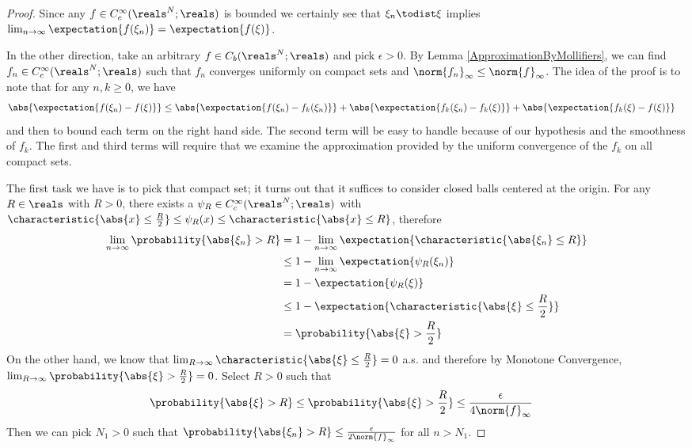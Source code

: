 \begin{proof}
Since any $f \in  C^\infty_c(\reals^N; \reals)$ is bounded we
certainly see that $\xi_n \todist \xi$ implies $\lim_{n \to \infty}
  \expectation{f(\xi_n)} = \expectation{f(\xi)}$.

In the other direction, take an arbitrary $f \in C_b(\reals^N;
\reals)$ and pick $\epsilon > 0$.  By Lemma \ref{ApproximationByMollifiers}, we can find $f_n
\in C^\infty_c(\reals^N; \reals)$ such that $f_n$ converges uniformly
on compact sets and $\norm{f_n}_\infty \leq \norm{f}_\infty$.  
The idea of the proof is to note that for any
$n, k \geq 0$, we have
\begin{align*}
\abs{\expectation{f(\xi_n) - f(\xi)}} &\leq \abs{\expectation{f(\xi_n)
    - f_k(\xi_n)}} + \abs{\expectation{f_k(\xi_n)    - f_k(\xi)}} + \abs{\expectation{f_k(\xi) - f(\xi)}}
\end{align*}
and then to bound each term on the right hand side.  The second term
will be easy to handle because of our hypothesis and the smoothness of
$f_k$.   The first and
third terms will require that we examine the approximation provided by
the uniform convergence of the $f_k$ on all compact sets.


The first task we have
is to pick that compact set; it turns out that it suffices to consider
closed balls centered at the origin.  For any $R \in \reals$ with $R>0$,
 there exists a $\psi_R \in C^\infty_c(\reals^N;\reals)$
with $\characteristic{\abs{x} \leq \frac{R}{2}} \leq \psi_R(x) \leq
\characteristic{\abs{x} \leq R}$,
therefore 
\begin{align*}
\lim_{n \to \infty} \probability{\abs{\xi_n} > R} &= 1 - \lim_{n \to
  \infty} \expectation{\characteristic{\abs{\xi_n} \leq R}} \\
&\leq 1 - \lim_{n \to
  \infty} \expectation{\psi_R(\xi_n)} \\
&=1 - \expectation{\psi_R(\xi)} \\
&\leq 1 - \expectation{\characteristic{\abs{\xi} \leq \frac{R}{2}}} \\
&=\probability{\abs{\xi} > \frac{R}{2}} 
\end{align*}
On the other hand, we know that $\lim_{R \to \infty}
\characteristic{\abs{\xi} \leq \frac{R}{2}} = 0$ a.s. and therefore by
Monotone Convergence, $\lim_{R \to \infty} \probability{\abs{\xi} >
  \frac{R}{2}} = 0$.  Select $R > 0$ such that  
\begin{align*}
\probability{\abs{\xi} >R} &\leq \probability{\abs{\xi} >\frac{R}{2}} \leq \frac{\epsilon}{4\norm{f}_\infty}
\end{align*}
Then we can
pick $N_1 > 0$ such that $\probability{\abs{\xi_n} >R} \leq \frac{\epsilon}{2\norm{f}_\infty}$ for all $n > N_1$.


\end{proof}
